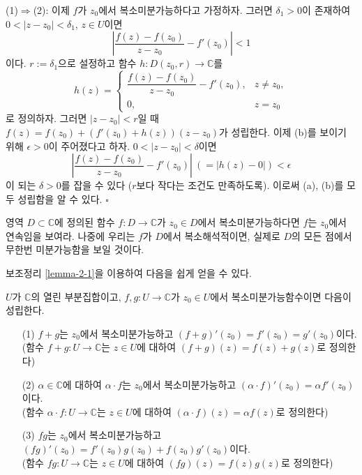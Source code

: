 (1)$\Rightarrow$(2):
이제 $f$가 $z_0$에서 복소미분가능하다고 가정하자. 
그러면 $\delta_1>0$이 존재하여 \\
$0<|z-z_0|<\delta_1$, $z\in U$이면 
\[
\left|  \dfrac{f(z) - f(z_0)}{z - z_0}  - f'(z_0) \right| < 1
\]
이다.
$r:=\delta_1$으로 설정하고 함수 $h:D(z_0,r) \to \mathbb C$를 
\[
h(z) = \begin{cases}
\dfrac{f(z) - f(z_0)}{z - z_0} - f'(z_0), & z\ne z_0, \\
0, & z= z_0
\end{cases}
\]
로 정의하자.
그러면 $|z-z_0|<r$일 때
$f(z) = f(z_0) + \left( f'(z_0) + h(z)\right) (z - z_0)$가 성립한다.
이제 (b)를 보이기 위해 $\epsilon>0$이 주어졌다고 하자.
$0<|z-z_0|<\delta$이면
\[
\left|  \dfrac{f(z) - f(z_0)}{z - z_0}  - f'(z_0) \right| \ \left( = |h(z) - 0| \right) < \epsilon
\]
이 되는 $\delta>0$를 잡을 수 있다 ($r$보다 작다는 조건도 만족하도록).
이로써 (a), (b)를 모두 성립함을 알 수 있다. \hfill $\square$

\begin{salt_exercise} \label{ex-2-3}
영역 $D\subset \mathbb C$에 정의된 함수 $f:D\to \mathbb C$가 
$z_0\in D$에서 복소미분가능하다면 $f$는 $z_0$에서 연속임을 보여라.
나중에 우리는 $f$가 $D$에서 복소해석적이면, 
실제로 $D$의 모든 점에서 무한번 미분가능함을 보일 것이다.
\end{salt_exercise}

보조정리 \ref{lemma-2-1}을 이용하여 다음을 쉽게 얻을 수 있다.

\begin{saltprop}{}{} \label{prop-2-1}
$U$가 $\mathbb C$의 열린 부분집합이고,
$f,g: U\to \mathbb C$가 $z_0\in U$에서 복소미분가능함수이면
다음이 성립한다.
\begin{itemize}
\item[(1)] $f+g$는 $z_0$에서 복소미분가능하고
$(f+g)'(z_0) = f'(z_0) = g'(z_0)$이다. \\
(함수 $f+g:U\to\mathbb C$는 $z\in U$에 대하여 $(f+g)(z) = f(z)+g(z)$로 정의한다)
\item[(2)] $\alpha\in\mathbb C$에 대하여 $\alpha\cdot f$는 $z_0$에서 복소미분가능하고
$(\alpha\cdot f)'(z_0) = \alpha f'(z_0)$이다. \\
(함수 $\alpha \cdot f:U\to\mathbb C$는 $z\in U$에 대하여 
$(\alpha \cdot f)(z) = \alpha f(z)$로 정의한다)
\item[(3)] $fg$는 $z_0$에서 복소미분가능하고
$(fg)'(z_0) = f'(z_0)g(z_0) + f(z_0)g'(z_0)$이다.\\
(함수 $fg:U\to\mathbb C$는 $z\in U$에 대하여 
$(fg)(z)= f(z)g(z)$로 정의한다)
\end{itemize}
\end{saltprop}

